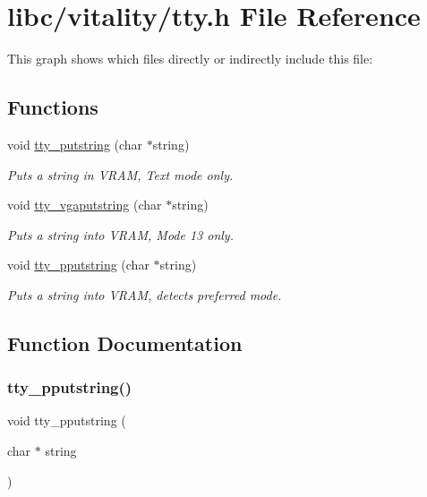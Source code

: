 \hypertarget{a00056}{}\section{libc/vitality/tty.h File Reference}
\label{a00056}
This graph shows which files directly or indirectly include this file\+:
\subsection*{Functions}
\begin{DoxyCompactItemize}
\item 
void \hyperlink{a00056_a2ebb962f457a2677d70285d1c0f9be12_a2ebb962f457a2677d70285d1c0f9be12}{tty\+\_\+putstring} (char $\ast$string)
\begin{DoxyCompactList}\small\item\em Puts a string in V\+R\+AM, Text mode only. \end{DoxyCompactList}\item 
void \hyperlink{a00056_a13ff2c06d56753c5666ca56cb2d81100_a13ff2c06d56753c5666ca56cb2d81100}{tty\+\_\+vgaputstring} (char $\ast$string)
\begin{DoxyCompactList}\small\item\em Puts a string into V\+R\+AM, Mode 13 only. \end{DoxyCompactList}\item 
void \hyperlink{a00056_ade960b1320324706aac6c00cc6b1b2fe_ade960b1320324706aac6c00cc6b1b2fe}{tty\+\_\+pputstring} (char $\ast$string)
\begin{DoxyCompactList}\small\item\em Puts a string into V\+R\+AM, detects preferred mode. \end{DoxyCompactList}\end{DoxyCompactItemize}


\subsection{Function Documentation}
\mbox{\label{a00056_ade960b1320324706aac6c00cc6b1b2fe_ade960b1320324706aac6c00cc6b1b2fe}} 
\subsubsection{\texorpdfstring{tty\+\_\+pputstring()}{tty\_pputstring()}}
{\footnotesize\ttfamily void tty\+\_\+pputstring (\begin{DoxyParamCaption}\item[{char $\ast$}]{string }\end{DoxyParamCaption})}



